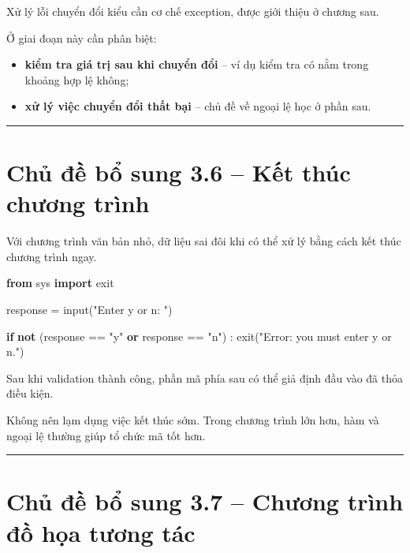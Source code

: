 \documentclass[
  11pt,
  a4paper,
]{article}
\newenvironment{Shaded}{}{}
\newcommand{\BuiltInTok}[1]{\textcolor[rgb]{0.00,0.50,0.00}{#1}}
\newcommand{\ControlFlowTok}[1]{\textcolor[rgb]{0.00,0.44,0.13}{\textbf{#1}}}
\newcommand{\ImportTok}[1]{\textcolor[rgb]{0.00,0.50,0.00}{\textbf{#1}}}
\newcommand{\KeywordTok}[1]{\textcolor[rgb]{0.00,0.44,0.13}{\textbf{#1}}}
\newcommand{\NormalTok}[1]{#1}
\newcommand{\OperatorTok}[1]{\textcolor[rgb]{0.40,0.40,0.40}{#1}}
\newcommand{\StringTok}[1]{\textcolor[rgb]{0.25,0.44,0.63}{#1}}
\providecommand{\tightlist}{%
  \setlength{\itemsep}{0pt}\setlength{\parskip}{0pt}}
\begin{document}
Xử lý lỗi chuyển đổi kiểu cần cơ chế exception, được giới thiệu ở chương
sau.

Ở giai đoạn này cần phân biệt:

\begin{itemize}
\tightlist
\item
  \textbf{kiểm tra giá trị sau khi chuyển đổi} -- ví dụ kiểm tra có nằm
  trong khoảng hợp lệ không;
\item
  \textbf{xử lý việc chuyển đổi thất bại} -- chủ đề về ngoại lệ học ở
  phần sau.
\end{itemize}

\begin{center}\rule{0.5\linewidth}{0.5pt}\end{center}

\section{Chủ đề bổ sung 3.6 -- Kết thúc chương
trình}\label{chux1ee7-ux111ux1ec1-bux1ed5-sung-3.6-kux1ebft-thuxfac-chux1b0ux1a1ng-truxecnh}

Với chương trình văn bản nhỏ, dữ liệu sai đôi khi có thể xử lý bằng cách
kết thúc chương trình ngay.

\begin{Shaded}
\begin{Highlighting}[]
\ImportTok{from}\NormalTok{ sys }\ImportTok{import}\NormalTok{ exit}

\NormalTok{response }\OperatorTok{=} \BuiltInTok{input}\NormalTok{(}\StringTok{"Enter y or n: "}\NormalTok{)}

\ControlFlowTok{if} \KeywordTok{not}\NormalTok{ (response }\OperatorTok{==} \StringTok{"y"} \KeywordTok{or}\NormalTok{ response }\OperatorTok{==} \StringTok{"n"}\NormalTok{) :}
\NormalTok{    exit(}\StringTok{"Error: you must enter y or n."}\NormalTok{)}
\end{Highlighting}
\end{Shaded}

Sau khi validation thành công, phần mã phía sau có thể giả định đầu vào
đã thỏa điều kiện.

Không nên lạm dụng việc kết thúc sớm. Trong chương trình lớn hơn, hàm và
ngoại lệ thường giúp tổ chức mã tốt hơn.

\begin{center}\rule{0.5\linewidth}{0.5pt}\end{center}

\section{Chủ đề bổ sung 3.7 -- Chương trình đồ họa tương
tác}\label{chux1ee7-ux111ux1ec1-bux1ed5-sung-3.7-chux1b0ux1a1ng-truxecnh-ux111ux1ed3-hux1ecda-tux1b0ux1a1ng-tuxe1c}
\end{document}
